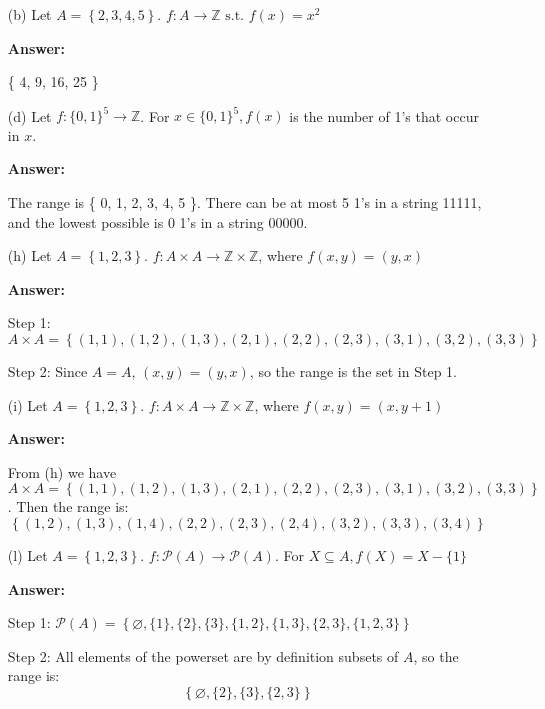 \documentclass[14pt]{extreport}
\newcommand{\answer}[0]{\medskip \textbf{Answer:} \medskip}
\newcommand{\Z}[0]{\mathbb{Z}}
\begin{document}
\begin{enumerate}
    
    \item[(b)] Let \( A = \left\{ 2, 3, 4, 5 \right\} \). \( f: A \rightarrow \Z \text{ s.t. } f(x) = x^2 \)
    
        \answer

        \{ 4, 9, 16, 25 \}
    
    \item[(d)] Let \( f: \{0, 1\}^{5} \rightarrow \Z \). For \( x \in \{ 0, 1 \}^5, f(x) \) is the number of 1's that occur in \( x \).

        \answer

        The range is \{ 0, 1, 2, 3, 4, 5 \}. There can be at most 5 1's in a string 11111, and the lowest possible is 0 1's in a string 00000.

    \item[(h)] Let \( A = \left\{ 1, 2, 3 \right\} \). \( f: A \times A \rightarrow \Z \times \Z \), where \( f(x, y) = (y, x) \)
    
        \answer

        Step 1: \( A \times A = \left\{ (1, 1), (1, 2), (1, 3), (2, 1), (2, 2), (2, 3), (3, 1), (3, 2), (3, 3) \right\} \)

        \medskip

        Step 2: Since \( A = A \), \( (x, y) = (y, x) \), so the range is the set in Step 1.

    \item[(i)] Let \( A = \left\{ 1, 2, 3 \right\} \). \( f: A \times A \rightarrow \Z \times \Z \), where \( f(x, y) = (x, y + 1) \)
    
        \answer

        From (h) we have \( A \times A = \left\{ (1, 1), (1, 2), (1, 3), (2, 1), (2, 2), (2, 3), (3, 1), (3, 2), (3, 3) \right\} \). Then the range is:
        \[
            \left\{ (1, 2), (1, 3), (1, 4), (2, 2), (2, 3), (2, 4), (3, 2), (3, 3), (3, 4) \right\}
        \]

    \item[(l)] Let \( A = \left\{ 1, 2, 3 \right\} \). \( f: \mathcal{P}(A) \rightarrow \mathcal{P}(A) \). For \( X \subseteq A, f(X) = X - \{1\} \)
    
        \answer

        Step 1: \( \mathcal{P}(A) = \left\{ \varnothing, \{ 1 \}, \{ 2 \}, \{ 3 \}, \{ 1, 2 \}, \{ 1, 3 \}, \{ 2, 3 \}, \{ 1, 2, 3 \} \right\} \)

        \medskip

        Step 2: All elements of the powerset are by definition subsets of \( A \), so the range is:
        \[
            \left\{ \varnothing, \{ 2 \}, \{ 3 \}, \{ 2, 3 \} \right\} 
        \]
        
\end{enumerate}
\end{document}
